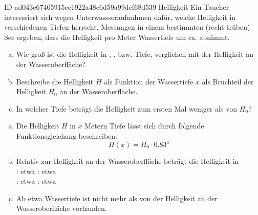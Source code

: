 \begin{exercise}
      {ID-ad043c67465915ee1922a48c6d59a99dcf68d539}
      {Helligkeit}
  \ifproblem\problem
    Ein Taucher interessiert sich wegen Unterwassseraufnahmen
    dafür, welche Helligkeit in verschiedenen Tiefen herrscht.
    Messungen in einem bestimmten (recht trüben) See ergeben,
    dass die Helligkeit pro Meter Wassertiefe um ca. 
    abnimmt.
    \begin{enumerate}[a)]
      \item Wie groß ist die Helligkeit in , ,
             bzw.  Tiefe, verglichen mit der
            Helligkeit an der Wasseroberfläche?
      \item Beschreibe die Helligkeit $H$ als Funktion der
            Wassertiefe $x$ als Bruchteil der Helligkeit
            $H_{0}$ an der Wasseroberfläche.
      \item In welcher Tiefe beträgt die Helligkeit zum ersten Mal
            weniger als  von $H_{0}$?
    \end{enumerate}
  \fi
  \ifoutcome\outcome
    \begin{enumerate}[a)]
      \item Die Helligkeit $H$ in $x$ Metern Tiefe lässt sich
            durch folgende Funktionsgleichung beschreiben:
            \begin{equation*}
              H(x)=H_{0}\cdot\num{0.83}^{x}
            \end{equation*}
      \item Relativ zur Helligkeit an der Wasseroberfläche beträgt
            die Helligkeit in\\
            : etwa
            : etwa
            \\
            : etwa
            : etwa
      \item Ab etwa  Wassertiefe ist nicht mehr als 
            von der Helligkeit an der Wasseroberfläche vorhanden.
    \end{enumerate}
  \fi
\end{exercise}
